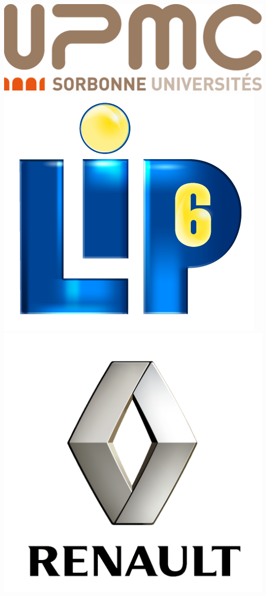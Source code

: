 \begin{titlepage}
\includegraphics[scale=0.1]{include/logo_upmc.png}  %
\hspace{1cm}
\includegraphics[scale=0.15]{include/logo_lip6.png} %
\hspace{1cm}
\includegraphics[scale=0.06]{include/logo_renault.png}\\

\end{titlepage}
